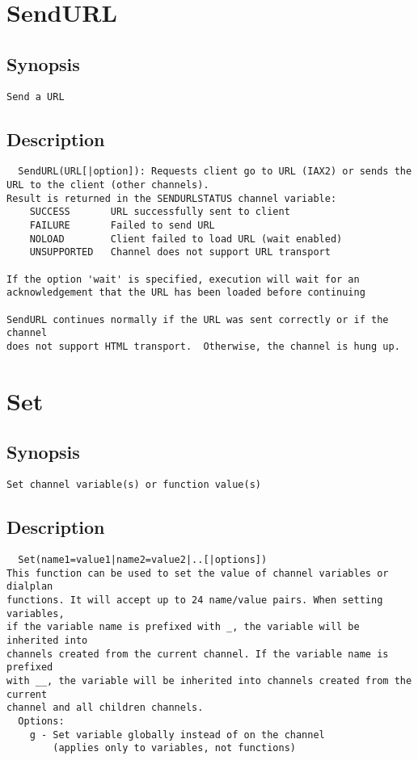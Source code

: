\section{SendURL}
\subsection{Synopsis}
\begin{verbatim}
Send a URL
\end{verbatim}
\subsection{Description}
\begin{verbatim}
  SendURL(URL[|option]): Requests client go to URL (IAX2) or sends the 
URL to the client (other channels).
Result is returned in the SENDURLSTATUS channel variable:
    SUCCESS       URL successfully sent to client
    FAILURE       Failed to send URL
    NOLOAD        Client failed to load URL (wait enabled)
    UNSUPPORTED   Channel does not support URL transport

If the option 'wait' is specified, execution will wait for an
acknowledgement that the URL has been loaded before continuing

SendURL continues normally if the URL was sent correctly or if the channel
does not support HTML transport.  Otherwise, the channel is hung up.

\end{verbatim}


\section{Set}
\subsection{Synopsis}
\begin{verbatim}
Set channel variable(s) or function value(s)
\end{verbatim}
\subsection{Description}
\begin{verbatim}
  Set(name1=value1|name2=value2|..[|options])
This function can be used to set the value of channel variables or dialplan
functions. It will accept up to 24 name/value pairs. When setting variables,
if the variable name is prefixed with _, the variable will be inherited into
channels created from the current channel. If the variable name is prefixed
with __, the variable will be inherited into channels created from the current
channel and all children channels.
  Options:
    g - Set variable globally instead of on the channel
        (applies only to variables, not functions)

\end{verbatim}


